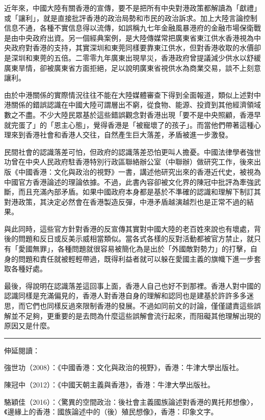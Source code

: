 近年來，中國大陸有關香港的宣傳，要不是把所有中央對港政策都解讀為「獻禮」或「讓利」，就是直接批評香港的政治局勢和市民的政治訴求。加上大陸言論控制信息不通，各種不實信息得以流傳，如誤稱九七年金融風暴港府的金融市場保衛戰是由中央政府出資。另一個經典案例，是大陸傳媒常把廣東省東江供水香港視為中央政府對香港的支持，其實深圳和東莞同樣要靠東江供水，但對香港收取的水價卻是深圳和東莞的五倍。二零零九年廣東出現旱災，香港政府曾提議減少供水以舒緩廣東旱情，卻被廣東省方面拒絕，足以說明廣東省視供水為商業交易，談不上刻意讓利。

由於中港關係的實際情況往往不能在大陸媒體審查下得到全面報道，類似上述對中港關係的錯誤認識在中國大陸可謂層出不窮，從食物、能源、投資到其他經濟領域數之不盡。不少大陸民眾基於這些錯誤觀念對香港出現「要不是中央照顧，香港早就完蛋了」的「恩主心態」，覺得香港是「被寵壞了的孩子」。而當他們帶著這種心理來到香港社會和香港人交往，自然產生巨大落差，矛盾被進一步激發。

民間社會的認識落差可怕，但政府的認識落差恐怕更叫人擔憂。中國法律學者強世功曾在中央人民政府駐香港特別行政區聯絡辦公室（中聯辦）做研究工作，後來出版《中國香港：文化與政治的視野》一書，講述他研究出來的香港近代史，被視為中國官方香港論述的理論依據。不過，此書內容卻被文化界的陳冠中批評為牽強武斷，而且充滿內部矛盾。如果中國政府本身都是基於不準確的認識和理解下制訂其對港政策，其決定必然會在香港製造反彈，中港矛盾越演越烈也是正常不過的結果。

與此同時，這些官方針對香港的反宣傳其實對中國大陸的老百姓來說也有壞處，背後的問題和反日或反美示威相當類似。當各式各樣的反對活動都被官方禁止，就只有「愛國無罪」，各種問題就很容易被簡化為是出於「外國敵對勢力」的打擊，自身的問題和責任就被輕輕帶過，既得利益者就可以躲在愛國主義的旗幟下進一步套取各種好處。

最後，得說明在認識落差這回事上面，香港人自己也好不到那裡。香港人對中國的認識同樣是充滿偏見的，香港人對香港自身的理解和認同也是建基於許許多多迷思，而它們也同樣反過來限制香港的發展。不過如同前文的討論，僅僅譴責這些誤解並不足夠，更重要的是去問為什麼這些誤解會流行起來，而阻礙其他理解出現的原因又是什麼。

\rule[-10pt]{15cm}{0.05em}

伸延閱讀：

強世功（2008）：《中國香港：文化與政治的視野》，香港：牛津大學出版社。

陳冠中（2012）：《中國天朝主義與香港》，香港：牛津大學出版社。

駱穎佳（2016）：〈驚異的空間政治：後社會主義國族論述對香港的異托邦想像〉，《邊緣上的香港：國族論述中的（後）殖民想像》，香港：印象文字。